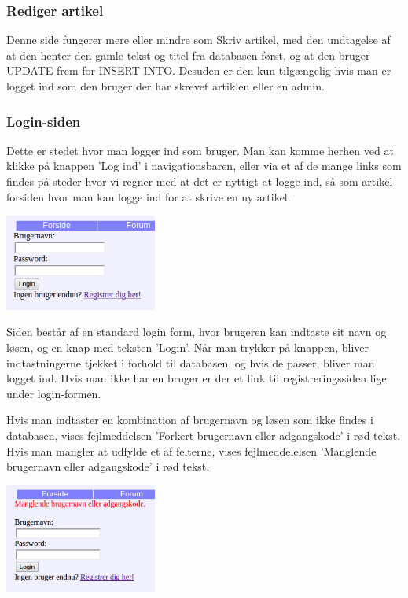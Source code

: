 \documentclass{article}
\begin{document}
\subsubsection{Rediger artikel}
Denne side fungerer mere eller mindre som Skriv artikel, med den undtagelse af at den henter den gamle tekst og titel fra databasen først, og at den bruger UPDATE frem for INSERT INTO. Desuden er den kun tilgængelig hvis man er logget ind som den bruger der har skrevet artiklen eller en admin.

\subsubsection{Login-siden}
Dette er stedet hvor man logger ind som bruger. Man kan komme herhen ved at klikke på knappen 'Log ind' i navigationsbaren, eller via et af de mange links som findes på steder hvor vi regner med at det er nyttigt at logge ind, så som artikel-forsiden hvor man kan logge ind for at skrive en ny artikel.

\begin{center}
\includegraphics[width=50mm]{mi07.png}
\end{center}

Siden består af en standard login form, hvor brugeren kan indtaste sit navn og løsen, og en knap med teksten 'Login'. Når man trykker på knappen, bliver indtastningerne tjekket i forhold til databasen, og hvis de passer, bliver man logget ind. Hvis man ikke har en bruger er der et link til registreringssiden lige under login-formen.

Hvis man indtaster en kombination af brugernavn og løsen som ikke findes i databasen, vises fejlmeddelsen 'Forkert brugernavn eller adgangskode' i rød tekst. Hvis man mangler at udfylde et af felterne, vises fejlmeddelelsen 'Manglende brugernavn eller adgangskode' i rød tekst. 

\begin{center}
\includegraphics[width=50mm]{mi09.png}
\end{center}
\end{document}
